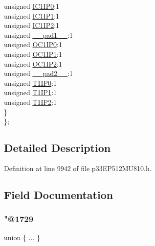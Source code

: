 \begin{DoxyCompactItemize}
\begin{tabbing}
\>\>unsigned \hyperlink{structtag_i_p_c0_b_i_t_s_afc6a3eef6cc739bde086084060587638}{IC1IP0}:1\\
\>\>unsigned \hyperlink{structtag_i_p_c0_b_i_t_s_aa0253de49a7ee0a765b3c9140fdb2f68}{IC1IP1}:1\\
\>\>unsigned \hyperlink{structtag_i_p_c0_b_i_t_s_a7a48f09132ec28b19990fc1d7e0240b6}{IC1IP2}:1\\
\>\>unsigned \hyperlink{structtag_i_p_c0_b_i_t_s_acaf2d0924a107ec6e8d2e31febaf66f9}{\_\_pad1\_\_}:1\\
\>\>unsigned \hyperlink{structtag_i_p_c0_b_i_t_s_a060894f1d8d83f7302ac261e49eda670}{OC1IP0}:1\\
\>\>unsigned \hyperlink{structtag_i_p_c0_b_i_t_s_a469abba6d71b9b0dbe8dccb5bf80f6da}{OC1IP1}:1\\
\>\>unsigned \hyperlink{structtag_i_p_c0_b_i_t_s_abec5d2f08945b3035e85cba88750fb02}{OC1IP2}:1\\
\>\>unsigned \hyperlink{structtag_i_p_c0_b_i_t_s_a4d97cc5f7d51d22fc2bf3eab35c9cb7f}{\_\_pad2\_\_}:1\\
\>\>unsigned \hyperlink{structtag_i_p_c0_b_i_t_s_a9911e6cbc0c5b780f10299228a367047}{T1IP0}:1\\
\>\>unsigned \hyperlink{structtag_i_p_c0_b_i_t_s_a3527a56155f3c5dbbd4e53acb03fb256}{T1IP1}:1\\
\>\>unsigned \hyperlink{structtag_i_p_c0_b_i_t_s_a59cd2529c1ae068c54c7f35cadc7c289}{T1IP2}:1\\
\>\} \\
\}; \\

\end{tabbing}\end{DoxyCompactItemize}


\subsection{Detailed Description}


Definition at line 9942 of file p33\+E\+P512\+M\+U810.\+h.



\subsection{Field Documentation}
\mbox{\label{structtag_i_p_c0_b_i_t_s_a06a22b7a2b8c4f735bed5058fe7fd8ad}} 
\subsubsection{\texorpdfstring{"@1729}{@1729}}
{\footnotesize\ttfamily union \{ ... \} }

